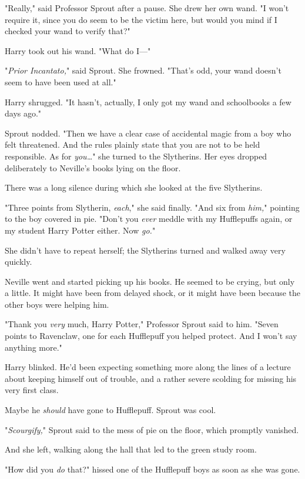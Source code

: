 "Really," said Professor Sprout after a pause. She drew her own wand. "I won't 
require it, since you do seem to be the victim here, but would you mind if I 
checked your wand to verify that?"

Harry took out his wand. "What do I---"

"\emph{Prior Incantato,}" said Sprout. She frowned. "That's odd, your wand 
doesn't seem to have been used at all."

Harry shrugged. "It hasn't, actually, I only got my wand and schoolbooks a few 
days ago."

Sprout nodded. "Then we have a clear case of accidental magic from a boy who 
felt threatened. And the rules plainly state that you are not to be held 
responsible. As for \emph{you{\ldots}}" she turned to the Slytherins. Her eyes 
dropped deliberately to Neville's books lying on the floor.

There was a long silence during which she looked at the five Slytherins.

"Three points from Slytherin, \emph{each}," she said finally. "And six from 
\emph{him,}" pointing to the boy covered in pie. "Don't you \emph{ever} meddle 
with my Hufflepuffs again, or my student Harry Potter either. Now \emph{go.}"

She didn't have to repeat herself; the Slytherins turned and walked away very 
quickly.

Neville went and started picking up his books. He seemed to be crying, but only 
a little. It might have been from delayed shock, or it might have been because 
the other boys were helping him.

"Thank you \emph{very} much, Harry Potter," Professor Sprout said to him. 
"Seven points to Ravenclaw, one for each Hufflepuff you helped protect. And I 
won't say anything more."

Harry blinked. He'd been expecting something more along the lines of a lecture 
about keeping himself out of trouble, and a rather severe scolding for missing 
his very first class.

Maybe he \emph{should} have gone to Hufflepuff. Sprout was cool.

"\emph{Scourgify,}" Sprout said to the mess of pie on the floor, which promptly 
vanished.

And she left, walking along the hall that led to the green study room.

"How did you \emph{do} that?" hissed one of the Hufflepuff boys as soon as she 
was gone.

